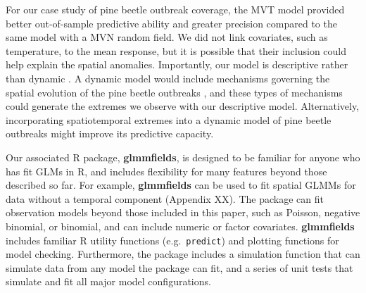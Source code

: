 \documentclass[12pt,english]{article}
\begin{document}
\begin{spacing}{1.9}


For our case study of pine beetle outbreak coverage, the MVT model provided
better out-of-sample predictive ability and greater precision compared to the
same model with a MVN random field. We did not link covariates, such as
temperature, to the mean response, but it is possible that their inclusion could
help explain the spatial anomalies. Importantly, our model is descriptive rather
than dynamic \citep{cressie2011}. A dynamic model would include mechanisms
governing the spatial evolution of the pine beetle outbreaks \citep[such as
available tree host size and quality,][]{chubaty2009}, and these types of
mechanisms could generate the extremes we observe with our descriptive model.
Alternatively, incorporating spatiotemporal extremes into a dynamic model of
pine beetle outbreaks might improve its predictive capacity.

Our associated R package, \textbf{glmmfields}, is designed to be familiar for
anyone who has fit GLMs in R, and includes flexibility for many features beyond
those described so far. For example, \textbf{glmmfields} can be used to fit
spatial GLMMs for data without a temporal component (Appendix XX). The package
can fit observation models beyond those included in this paper, such as Poisson,
negative binomial, or binomial, and can include numeric or factor covariates.
\textbf{glmmfields} includes familiar R utility functions (e.g.\
\texttt{predict}) and plotting functions for model checking. Furthermore, the
package includes a simulation function that can simulate data from any model the
package can fit, and a series of unit tests that simulate and fit all major
model configurations.


\end{spacing}
\end{document}
